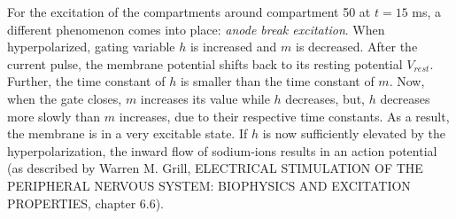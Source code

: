 \documentclass[
a4paper, 
12pt, 
]{article}
\begin{document}
\begin{itemize}
	For the excitation of the compartments around compartment 50 at $t = 15$ ms, a different phenomenon comes into place: \textit{anode break excitation}. When hyperpolarized, gating variable $h$ is increased and $m$ is decreased. After the current pulse, the membrane potential shifts back to its resting potential $V_{rest}$. Further, the time constant of $h$ is smaller than the time constant of $m$. Now, when the gate closes, $m$ increases its value while $h$ decreases, but, $h$ decreases more slowly than $m$ increases, due to their respective time constants. As a result, the membrane is in a  very excitable state. If $h$ is now sufficiently elevated by the hyperpolarization, the inward flow of sodium-ions results in an action potential (as described by Warren M. Grill, ELECTRICAL STIMULATION OF THE PERIPHERAL NERVOUS SYSTEM: BIOPHYSICS AND EXCITATION PROPERTIES, chapter 6.6). 
\end{itemize}



	
	
\end{document}

